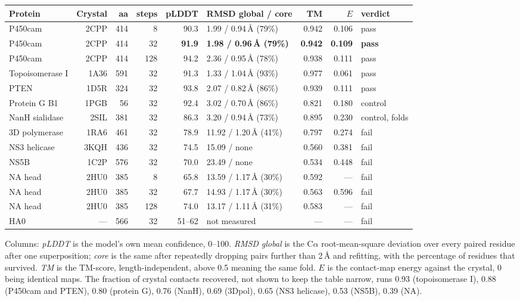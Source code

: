 \documentclass[11pt,a4paper]{article}
\begin{document}
\begin{center}
\small
\begin{tabular}{l r r r r l r r l}
\toprule
Protein & Crystal & aa & steps & pLDDT & RMSD global / core & TM & $E$ & verdict \\
\midrule
P450cam        & 2CPP & 414 &  8 & 90.3 & 1.99 / 0.94\,\AA{} (79\%) & 0.942 & 0.106 & pass \\
P450cam        & 2CPP & 414 & 32 & \textbf{91.9} & \textbf{1.98 / 0.96\,\AA{} (79\%)} & \textbf{0.942} & \textbf{0.109} & \textbf{pass} \\
P450cam        & 2CPP & 414 & 128 & 94.2 & 2.36 / 0.95\,\AA{} (78\%) & 0.938 & 0.111 & pass \\
Topoisomerase I & 1A36 & 591 & 32 & 91.3 & 1.33 / 1.04\,\AA{} (93\%) & 0.977 & 0.061 & pass \\
PTEN           & 1D5R & 324 & 32 & 93.8 & 2.07 / 0.82\,\AA{} (86\%) & 0.939 & 0.111 & pass \\
Protein G B1   & 1PGB &  56 & 32 & 92.4 & 3.02 / 0.70\,\AA{} (86\%) & 0.821 & 0.180 & control \\
NanH sialidase & 2SIL & 381 & 32 & 86.3 & 3.20 / 0.94\,\AA{} (73\%) & 0.895 & 0.230 & control, folds \\
3D polymerase  & 1RA6 & 461 & 32 & 78.9 & 11.92 / 1.20\,\AA{} (41\%) & 0.797 & 0.274 & fail \\
NS3 helicase   & 3KQH & 436 & 32 & 74.5 & 15.09 / none & 0.560 & 0.381 & fail \\
NS5B           & 1C2P & 576 & 32 & 70.0 & 23.49 / none & 0.534 & 0.448 & fail \\
NA head        & 2HU0 & 385 &  8 & 65.8 & 13.59 / 1.17\,\AA{} (30\%) & 0.592 & --- & fail \\
NA head        & 2HU0 & 385 & 32 & 67.7 & 14.93 / 1.17\,\AA{} (30\%) & 0.563 & 0.596 & fail \\
NA head        & 2HU0 & 385 & 128 & 74.0 & 13.17 / 1.11\,\AA{} (31\%) & 0.583 & --- & fail \\
HA0            & --- & 566 & 32 & 51--62 & not measured & --- & --- & fail \\
\bottomrule
\end{tabular}
\end{center}

\noindent Columns: \emph{pLDDT} is the model's own mean confidence, 0--100.
\emph{RMSD global} is the C$\alpha$ root-mean-square deviation over every paired
residue after one superposition; \emph{core} is the same after repeatedly
dropping pairs further than 2\,\AA{} and refitting, with the percentage of
residues that survived. \emph{TM} is the TM-score, length-independent, above 0.5
meaning the same fold. $E$ is the contact-map energy against the crystal, 0 being
identical maps. The fraction of crystal contacts recovered, not shown to keep the
table narrow, runs 0.93 (topoisomerase I), 0.88 (P450cam and PTEN), 0.80 (protein G),
0.76 (NanH), 0.69 (3Dpol), 0.65 (NS3 helicase), 0.53 (NS5B), 0.39 (NA).
\end{document}
